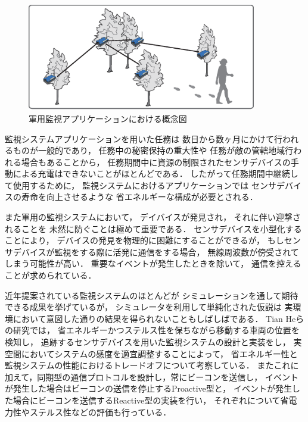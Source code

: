 \begin{figure}[htbp]
 \begin{center}
  \includegraphics[width=100mm]{./images/surveillance_system.eps}
 \end{center}
 \caption{軍用監視アプリケーションにおける概念図}
 \label{fig:surveillance_system}
\end{figure}



監視システムアプリケーションを用いた任務は
数日から数ヶ月にかけて行われるものが一般的であり，
任務中の秘密保持の重大性や
任務が敵の管轄地域行われる場合もあることから，
任務期間中に資源の制限されたセンサデバイスの手動による充電はできないことがほとんどである．
したがって任務期間中継続して使用するために，
監視システムにおけるアプリケーションでは
センサデバイスの寿命を向上させるような
省エネルギーな構成が必要とされる．

また軍用の監視システムにおいて，
デイバイスが発見され，
それに伴い迎撃されることを
未然に防ぐことは極めて重要である．
センサデバイスを小型化することにより，
デバイスの発見を物理的に困難にすることができるが，
もしセンサデバイスが監視をする際に活発に通信をする場合，
無線周波数が傍受されてしまう可能性が高い．
重要なイベントが発生したときを除いて，
通信を控えることが求められている．

近年提案されている監視システムのほとんどが
シミュレーションを通して期待できる成果を挙げているが，
シミュレータを利用して単純化された仮説は
実環境において意図した通りの結果を得られないこともしばしばである．
Tian Heらの研究\cite{He04energy-efficientsurveillance}では，
省エネルギーかつステルス性を保ちながら移動する車両の位置を検知し，
追跡するセンサデバイスを用いた監視システムの設計と実装をし，
実空間においてシステムの感度を適宜調整することによって，
省エネルギー性と監視システムの性能におけるトレードオフについて考察している．
またこれに加えて，同期型の通信プロトコルを設計し，常にビーコンを送信し，
イベントが発生した場合はビーコンの送信を停止するProactive型と，
イベントが発生した場合にビーコンを送信するReactive型の実装を行い，
それぞれについて省電力性やステルス性などの評価も行っている．


